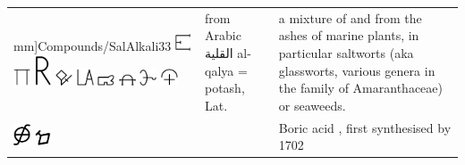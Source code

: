 \documentclass[british,final,landscape]{scrartcl}
\begin{document}
\begin{refsection}
\begin{supertabular}{p{0.3\textwidth}p{0.34\textwidth}p{0.34\textwidth}}
mm]{Compounds/SalAlkali33} \includegraphics[height=5mm]{Compounds/SalAlkali34} \includegraphics[width=5mm]{Compounds/SalAlkali35} \includegraphics[width=5mm]{Compounds/SalAlkali36} \includegraphics[width=5mm]{Compounds/SalAlkali37} \includegraphics[width=5mm]{Compounds/SalAlkali38} \includegraphics[width=5mm]{Compounds/SalAlkali39} \includegraphics[width=5mm]{Compounds/SalAlkali40} \includegraphics[width=5mm]{Compounds/SalAlkali41} \includegraphics[width=5mm]{Compounds/SalAlkali42} &  from Arabic \foreignlanguage{arabic}{القلية} al-qalya = potash, Lat.  & a mixture of  and  from the ashes of marine plants, in particular saltworts (aka glassworts, various genera in the family of Amaranthaceae) or seaweeds. \\
   \includegraphics[width=5mm]{Compounds/SalSedativus} \includegraphics[width=5mm]{Compounds/FloresVitrioli} &  & Boric acid , first synthesised by  \num{1702} \\

\end{supertabular}
\end{refsection}
\end{document}
